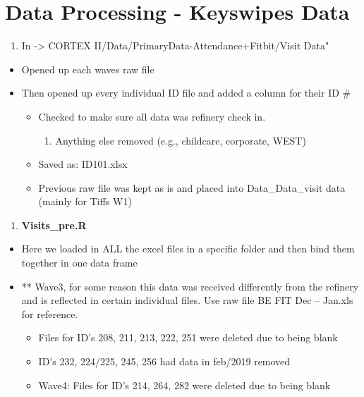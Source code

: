 \documentclass[
]{book}
\providecommand{\tightlist}{%
  \setlength{\itemsep}{0pt}\setlength{\parskip}{0pt}}
\begin{document}
\hypertarget{data-processing---keyswipes-data}{%
\chapter{Data Processing - Keyswipes Data}\label{data-processing---keyswipes-data}}

\begin{enumerate}
\def\labelenumi{\arabic{enumi}.}
\tightlist
\item
  In -\textgreater{} CORTEX II/Data/PrimaryData-Attendance+Fitbit/Visit Data"
\end{enumerate}

\begin{itemize}
\tightlist
\item
  Opened up each waves raw file
\item
  Then opened up every individual ID file and added a column for their ID \#

  \begin{itemize}
  \tightlist
  \item
    Checked to make sure all data was refinery check in.

    \begin{enumerate}
    \def\labelenumi{\arabic{enumi}.}
    \tightlist
    \item
      Anything else removed (e.g., childcare, corporate, WEST)
    \end{enumerate}
  \item
    Saved as: ID101.xlsx
  \item
    Previous raw file was kept as is and placed into Data\WaveX\Visit\_Data\WaveX\_visit data (mainly for Tiffs W1)
  \end{itemize}
\end{itemize}

\begin{enumerate}
\def\labelenumi{\arabic{enumi}.}
\setcounter{enumi}{1}
\tightlist
\item
  \textbf{Visits\_pre.R}
\end{enumerate}

\begin{itemize}
\tightlist
\item
  Here we loaded in ALL the excel files in a specific folder and then bind them together in one data frame
\item
  ** Wave3, for some reason this data was received differently from the refinery and is reflected in certain individual files. Use raw file BE FIT Dec -- Jan.xls for reference.

  \begin{itemize}
  \tightlist
  \item
    Files for ID's 208, 211, 213, 222, 251 were deleted due to being blank
  \item
    ID's 232, 224/225, 245, 256 had data in feb/2019 removed
  \item
    Wave4: Files for ID's 214, 264, 282 were deleted due to being blank
  \end{itemize}
\end{itemize}
\end{document}
